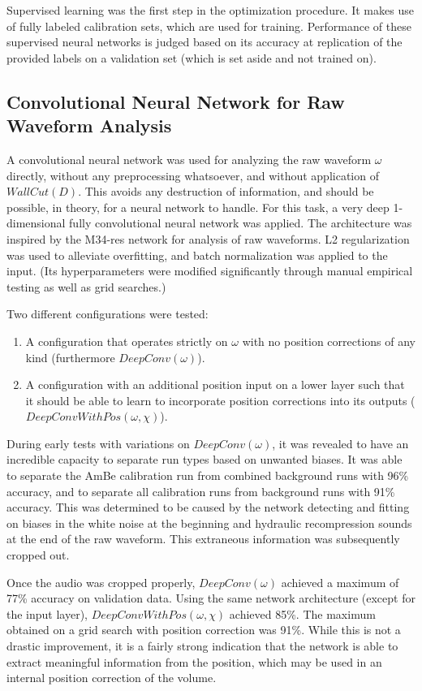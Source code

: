 \documentclass[10pt]{article}
\begin{document}
Supervised learning was the first step in the optimization procedure. It makes use of fully labeled calibration sets, which are used for training. Performance of these supervised neural networks is judged based on its accuracy at replication of the provided labels on a validation set (which is set aside and not trained on).

\subsection{Convolutional Neural Network for Raw Waveform Analysis}

A convolutional neural network was used for analyzing the raw waveform $\omega$ directly, without any preprocessing whatsoever, and without application of $WallCut(D)$. This avoids any destruction of information, and should be possible, in theory, for a neural network to handle. For this task, a very deep 1-dimensional fully convolutional neural network was applied. The architecture was inspired by the M34-res network \cite{verydeepconvnets} for analysis of raw waveforms. L2 regularization was used to alleviate overfitting, and batch normalization was applied to the input. (Its hyperparameters were modified significantly through manual empirical testing as well as grid searches.)

Two different configurations were tested:
\begin{enumerate}
    \item A configuration that operates strictly on $\omega$ with no position corrections of any kind (furthermore $DeepConv(\omega)$).
    \item A configuration with an additional position input on a lower layer such that it should be able to learn to incorporate position corrections into its outputs ($DeepConvWithPos(\omega, \chi)$).
\end{enumerate}

During early tests with variations on $DeepConv(\omega)$, it was revealed to have an incredible capacity to separate run types based on unwanted biases. It was able to separate the AmBe calibration run from combined background runs with 96\% accuracy, and to separate all calibration runs from background runs with 91\% accuracy. This was determined to be caused by the network detecting and fitting on biases in the white noise at the beginning and hydraulic recompression sounds at the end of the raw waveform. This extraneous information was subsequently cropped out.

Once the audio was cropped properly, $DeepConv(\omega)$ achieved a maximum of 77\% accuracy on validation data. Using the same network architecture (except for the input layer), $DeepConvWithPos(\omega, \chi)$ achieved 85\%. The maximum obtained on a grid search with position correction was 91\%. While this is not a drastic improvement, it is a fairly strong indication that the network is able to extract meaningful information from the position, which may be used in an internal position correction of the volume.
\end{document}
